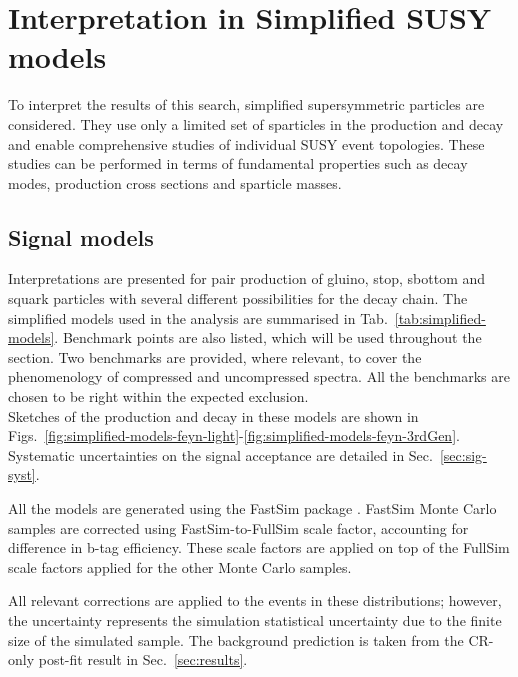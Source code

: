 \section{Interpretation in Simplified SUSY models}
\label{sec:susy}

To interpret the results of this search, simplified
supersymmetric particles are considered.  They use only a limited set
of sparticles in the production and decay and enable comprehensive
studies of individual SUSY event topologies. These studies can be
performed in terms of fundamental properties such as decay modes,
production cross sections and sparticle masses.

\subsection{Signal models}
\label{sec:susy_models}
Interpretations are presented for pair production of gluino, stop, sbottom and
squark particles with several different possibilities for the decay
chain. The simplified models used in the analysis are summarised in
Tab.~\ref{tab:simplified-models}. Benchmark points are also listed, which will
be used throughout the section. Two benchmarks are provided, where relevant,
to cover the phenomenology of compressed and uncompressed spectra. All the
benchmarks are chosen to be right within the expected exclusion. \\

Sketches of the production and decay in these models are shown in
Figs.~\ref{fig:simplified-models-feyn-light}-\ref{fig:simplified-models-feyn-3rdGen}.
Systematic uncertainties on the signal acceptance are detailed in
Sec.~\ref{sec:sig-syst}.

All the models are generated using the FastSim package
\cite{Abdullin:2011zz}.  FastSim Monte Carlo samples are corrected
using FastSim-to-FullSim scale factor, accounting for difference in
b-tag efficiency. These scale factors are applied on top of the
FullSim scale factors applied for the other Monte Carlo samples.

All relevant corrections are applied to the events in these distributions;
however, the uncertainty represents the simulation statistical uncertainty due
to the finite size of the simulated sample. The background prediction is taken
from the CR-only post-fit result in Sec.~\ref{sec:results}.

